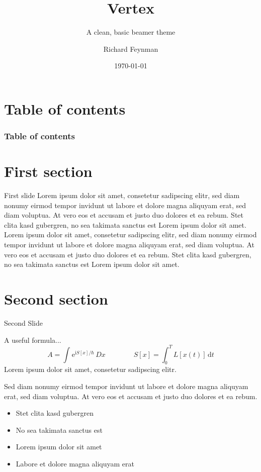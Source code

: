 \documentclass[compress,aspectratio=1610]{beamer}
\title{Vertex}
\subtitle{A clean, basic beamer theme}
\date{\today}
\author{Richard Feynman}
\institute[TU Dortmund]{Technische Universität Dortmund}
\begin{document}
\maketitle

\section*{Table of contents}
\begin{frame}
	\frametitle{Table of contents}
  \centering
	\tableofcontents[hideallsubsections]
\end{frame}

\section{First section}
\begin{frame}{First slide}
	Lorem ipsum dolor sit amet, consetetur sadipscing elitr, sed diam nonumy eirmod tempor invidunt ut labore et dolore magna aliquyam erat, sed diam voluptua. At vero eos et accusam et justo duo dolores et ea rebum. Stet clita kasd gubergren, no sea takimata sanctus est Lorem ipsum dolor sit amet. Lorem  ipsum dolor sit amet, consetetur sadipscing elitr, sed diam nonumy eirmod tempor invidunt ut labore et dolore magna aliquyam erat, sed diam voluptua. At vero eos et accusam et justo duo dolores et ea rebum. Stet clita kasd gubergren, no sea takimata sanctus est Lorem ipsum dolor sit amet.
\end{frame}

\section{Second section}
\begin{frame}{Second Slide}
  \begin{block}{A useful formula...}
    \begin{equation*}
      A = \int^{}\mathrm{e}^{\mathrm{i} S[x] / \hbar}\,Dx \hspace{4em} S[x] = \int^{T}_0 L[x(t)]\,\mathrm{d}t
    \end{equation*}
    \centering
Lorem ipsum dolor sit amet, consetetur sadipscing elitr.
  \end{block}
  \begin{multicols}{2}
Sed diam nonumy eirmod tempor invidunt ut labore et dolore magna aliquyam erat, sed diam voluptua. At vero eos et accusam et justo duo dolores et ea rebum.
  \columnbreak
  \begin{itemize}
    \item Stet clita kasd gubergren
    \item No sea takimata sanctus est
    \item Lorem ipsum dolor sit amet
    \item Labore et dolore magna aliquyam erat
  \end{itemize}
  \end{multicols}
\end{frame}
\end{document}
